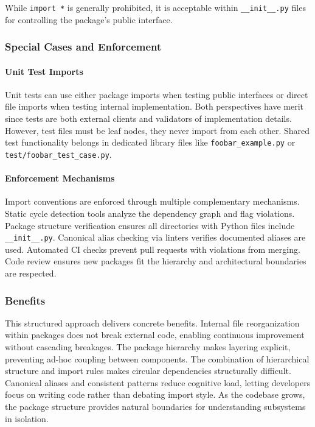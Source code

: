 While \texttt{import *} is generally prohibited, it is acceptable within
\texttt{\_\_init\_\_.py} files for controlling the package's public
interface.

\subsubsection{Special Cases and Enforcement}

\paragraph{Unit Test Imports}
Unit tests can use either package imports when testing public interfaces
or direct file imports when testing internal implementation. Both
perspectives have merit since tests are both external clients and
validators of implementation details. However, test files must be leaf
nodes, they never import from each other. Shared test functionality
belongs in dedicated library files like \texttt{foobar\_example.py}
or \texttt{test/foobar\_test\_case.py}.

\paragraph{Enforcement Mechanisms}
Import conventions are enforced through multiple complementary mechanisms.
Static cycle detection tools analyze the dependency graph and flag
violations. Package structure verification ensures all directories
with Python files include \texttt{\_\_init\_\_.py}. Canonical alias
checking via linters verifies documented aliases are used. Automated
CI checks prevent pull requests with violations from merging. Code
review ensures new packages fit the hierarchy and architectural boundaries
are respected.

\subsubsection{Benefits}

This structured approach delivers concrete benefits. Internal file
reorganization within packages does not break external code, enabling
continuous improvement without cascading breakages. The package hierarchy
makes layering explicit, preventing ad-hoc coupling between components.
The combination of hierarchical structure and import rules makes circular
dependencies structurally difficult. Canonical aliases and consistent
patterns reduce cognitive load, letting developers focus on writing
code rather than debating import style. As the codebase grows, the
package structure provides natural boundaries for understanding subsystems
in isolation.

